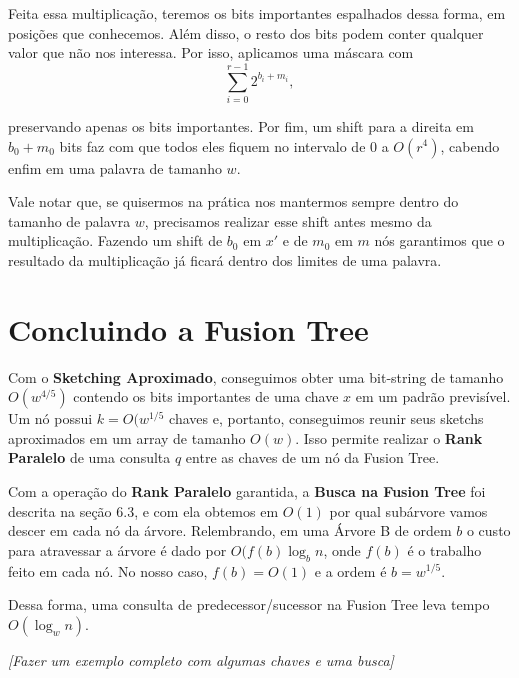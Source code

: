 Feita essa multiplicação, teremos os bits importantes espalhados dessa forma, em
posições que conhecemos. Além disso, o resto dos bits podem conter qualquer
valor que não nos interessa. Por isso, aplicamos uma máscara com
\[
\sum_{i=0}^{r-1} 2^{b_i+m_i},
\]

preservando apenas os bits importantes. Por fim, um shift para a direita em
$b_0+m_0$ bits faz com que todos eles fiquem no intervalo de 0 a $O(r^4)$,
cabendo enfim em uma palavra de tamanho $w$.

Vale notar que, se quisermos na prática nos mantermos sempre dentro do tamanho de
palavra $w$, precisamos realizar esse shift antes mesmo da multiplicação.
Fazendo um shift de $b_0$ em $x'$ e de $m_0$ em $m$ nós garantimos que o
resultado da multiplicação já ficará dentro dos limites de uma palavra.   

\section{Concluindo a Fusion Tree}

Com o \textbf{Sketching Aproximado}, conseguimos obter uma bit-string de tamanho
$O(w^{4/5})$ contendo os bits importantes de uma chave $x$ em um padrão
previsível. Um nó possui $k=O(w^{1/5}$ chaves e, portanto, conseguimos reunir
seus sketchs aproximados em um array de tamanho $O(w)$. Isso permite realizar o
\textbf{Rank Paralelo} de uma consulta $q$ entre as chaves de um nó da Fusion
Tree.

Com a operação do \textbf{Rank Paralelo} garantida, a \textbf{Busca na Fusion
Tree} foi descrita na seção 6.3, e com ela obtemos em $O(1)$ por qual subárvore
vamos descer em cada nó da árvore. Relembrando, em uma Árvore B de ordem $b$ o
custo para atravessar a árvore é dado por $O(f(b)\log_b n$, onde $f(b)$ é o
trabalho feito em cada nó. No nosso caso, $f(b)=O(1)$ e a ordem é $b=w^{1/5}$.

Dessa forma, uma consulta de predecessor/sucessor na Fusion Tree leva tempo
$O(\log_w n)$.

\textit{[Fazer um exemplo completo com algumas chaves e uma busca]}
